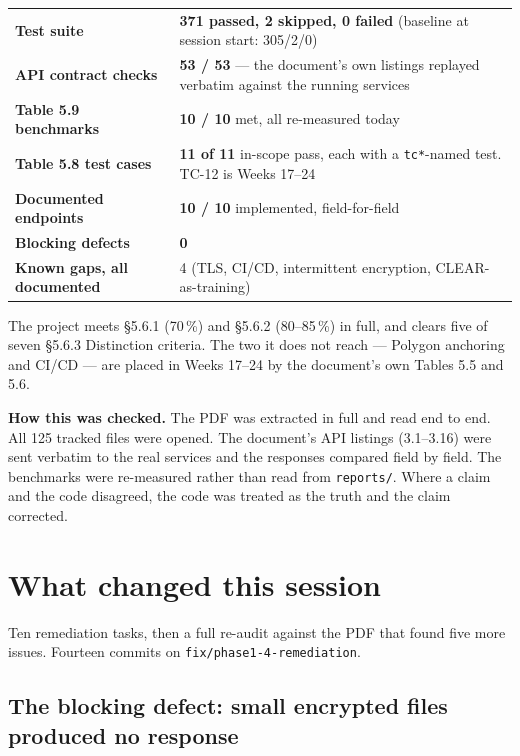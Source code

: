 \documentclass[11pt,a4paper]{article}
\begin{document}
\noindent
\begin{tabularx}{\linewidth}{@{}P{4.3cm}L@{}}
\toprule
\textbf{Test suite}          & \textbf{371 passed, 2 skipped, 0 failed} (baseline at session start: 305/2/0) \\
\textbf{API contract checks} & \textbf{53 / 53} --- the document's own listings replayed verbatim against the running services \\
\textbf{Table 5.9 benchmarks}& \textbf{10 / 10} met, all re-measured today \\
\textbf{Table 5.8 test cases}& \textbf{11 of 11} in-scope pass, each with a \texttt{tc*}-named test. TC-12 is Weeks 17--24 \\
\textbf{Documented endpoints}& \textbf{10 / 10} implemented, field-for-field \\
\textbf{Blocking defects}    & \textbf{0} \\
\textbf{Known gaps, all documented} & 4 (TLS, CI/CD, intermittent encryption, CLEAR-as-training) \\
\bottomrule
\end{tabularx}

\vspace{1em}

The project meets \S5.6.1 (70\,\%) and \S5.6.2 (80--85\,\%) in full, and clears five of
seven \S5.6.3 Distinction criteria. The two it does not reach --- Polygon anchoring
and CI/CD --- are placed in Weeks 17--24 by the document's own Tables 5.5 and 5.6.

\textbf{How this was checked.} The PDF was extracted in full and read end to end. All
125 tracked files were opened. The document's API listings (3.1--3.16) were sent
verbatim to the real services and the responses compared field by field. The
benchmarks were re-measured rather than read from \texttt{reports/}. Where a claim and
the code disagreed, the code was treated as the truth and the claim corrected.

\section{What changed this session}

Ten remediation tasks, then a full re-audit against the PDF that found five more
issues. Fourteen commits on \texttt{fix/phase1-4-remediation}.

\subsection{The blocking defect: small encrypted files produced no response}
\end{document}
